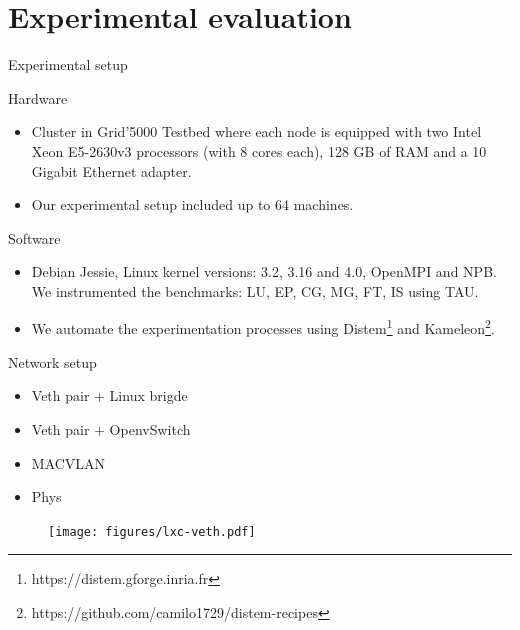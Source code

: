 \documentclass[presentation]{beamer}
\begin{document}
\section{Experimental evaluation}
\label{sec-3}

\begin{frame}[label=sec-3-1]{Experimental setup}
\begin{block}{Hardware}
\begin{itemize}
\item Cluster in Grid'5000 Testbed\cite{grid5000} where each node is equipped with two Intel Xeon E5-2630v3 processors (with 8 cores each), 128 GB of RAM and
a 10 Gigabit Ethernet adapter.
\item Our experimental setup included up to 64 machines.
\end{itemize}
\end{block}

\begin{block}{Software}
\begin{itemize}
\item Debian Jessie, Linux kernel versions: 3.2, 3.16 and 4.0, OpenMPI and NPB.
We instrumented the benchmarks: LU, EP, CG, MG, FT, IS using TAU.
\end{itemize}
\begin{itemize}
\item We automate the experimentation processes using Distem\footnote{https://distem.gforge.inria.fr}
  and Kameleon\footnote{https://github.com/camilo1729/distem-recipes}.
\end{itemize}
\end{block}
\end{frame}


\begin{frame}[label=sec-3-2]{Network setup}
\begin{itemize}
\item \alert{Veth pair + Linux brigde}
\item Veth pair + OpenvSwitch
\item MACVLAN
\item Phys
\end{itemize}

\begin{figure}[!h]
  \center
  \texttt{[image: figures/lxc-veth.pdf]}
  \label{fig:hpc}
\end{figure}
\end{frame}
\end{document}
